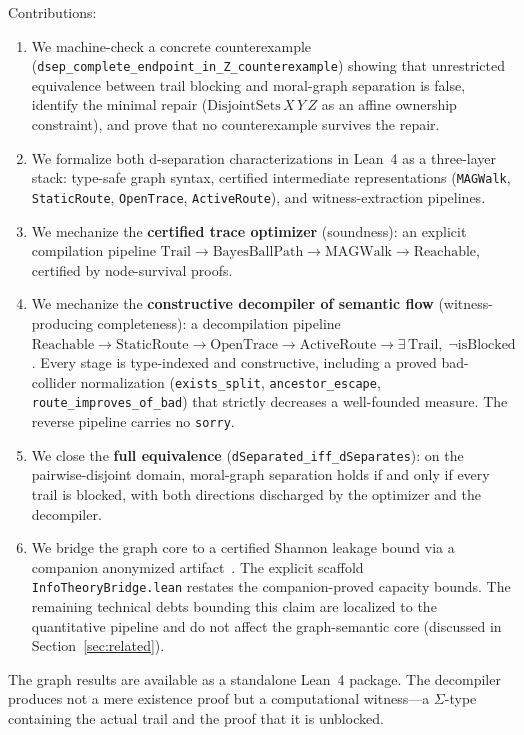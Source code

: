 \documentclass[acmsmall,screen,nonacm]{acmart}
\newcommand{\lean}[1]{\lstinline!#1!}
\begin{document}
Contributions:
\begin{enumerate}
  \item We machine-check a concrete counterexample
    (\lean{dsep_complete_endpoint_in_Z_counterexample}) showing that
    unrestricted equivalence between trail blocking and moral-graph separation
    is false, identify the minimal repair ($\text{DisjointSets}\,X\,Y\,Z$ as
    an affine ownership constraint), and prove that no counterexample survives
    the repair.
  \item We formalize both d-separation characterizations in Lean~4 as a
    three-layer stack: type-safe graph syntax, certified intermediate
    representations (\lean{MAGWalk}, \lean{StaticRoute}, \lean{OpenTrace},
    \lean{ActiveRoute}), and witness-extraction pipelines.
  \item We mechanize the \textbf{certified trace optimizer} (soundness): an
    explicit compilation pipeline
    $\text{Trail} \to \text{BayesBallPath} \to \text{MAGWalk} \to \allowbreak \text{Reachable}$,
    certified by node-survival proofs.
  \item We mechanize the \textbf{constructive decompiler of semantic flow}
    (witness-producing completeness): a decompilation pipeline
    $\text{Reachable} \to \text{StaticRoute} \to \text{OpenTrace} \to \allowbreak \text{ActiveRoute} \to \exists\,\text{Trail},\;\neg\text{isBlocked}$.
    Every stage is type-indexed and constructive, including a proved
    bad-collider normalization (\lean{exists_split}, \lean{ancestor_escape},
    \lean{route_improves_of_bad}) that strictly decreases a well-founded
    measure.  The reverse pipeline carries no \lean{sorry}.
  \item We close the \textbf{full equivalence}
    (\lean{dSeparated_iff_dSeparates}): on the pairwise-disjoint domain,
    moral-graph separation holds if and only if every trail is blocked, with
    both directions discharged by the optimizer and the decompiler.
  \item We bridge the graph core to a certified Shannon leakage bound via a
    companion anonymized artifact~\cite{companionqif}. The explicit scaffold
    \lean{InfoTheoryBridge.lean} restates the companion-proved capacity bounds. 
    The remaining technical debts bounding this claim are localized to the
    quantitative pipeline and do not affect the graph-semantic core 
    (discussed in Section~\ref{sec:related}).
\end{enumerate}

The graph results are available as a standalone Lean~4 package.  The
decompiler produces not a mere existence proof but a computational
witness---a $\Sigma$-type containing the actual trail and the proof that it is
unblocked.
\end{document}
